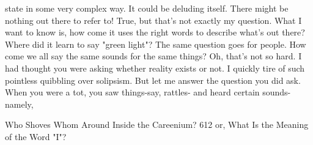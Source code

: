   state in some very complex way. It could be deluding itself. There might be
  nothing out there to refer to!
\achilles True, but that's not exactly my question. What I want to know is, how
  come it uses the right words to describe what's out there? Where did it learn to say
  "green light"? The same question goes for people. How come we all say the same
  sounds for the same things?
\tortoise Oh, that's not so hard. I had thought you were asking whether reality
  exists or not. I quickly tire of such pointless quibbling over solipsism. But let me
  answer the question you did ask. When you were a tot, you saw things-say, rattles-
  and heard certain sounds-namely,




Who Shoves Whom Around Inside the Careenium?                                           612
or, What Is the Meaning of the Word "I"?

